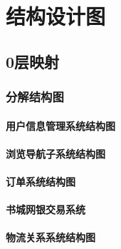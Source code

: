 \chapter{结构设计图}
\section{0层映射}
\subsection{分解结构图}
\subsubsection{用户信息管理系统结构图}
\subsubsection{浏览导航子系统结构图}
\subsubsection{订单系统结构图}
\subsubsection{书城网银交易系统}
\subsubsection{物流关系系统结构图}